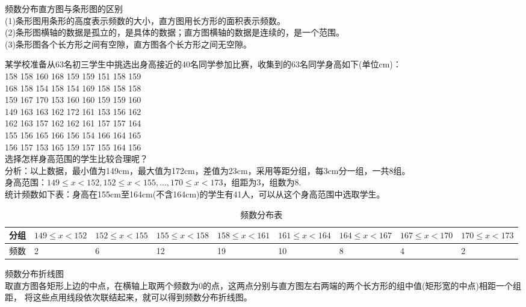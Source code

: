 \begin{theorem}
    频数分布直方图与条形图的区别 \\
    (1)条形图用条形的高度表示频数的大小，直方图用长方形的面积表示频数。\\
    (2)条形图横轴的数据是孤立的，是具体的数据；直方图横轴的数据是连续的，是一个范围。 \\
    (3)条形图各个长方形之间有空隙，直方图各个长方形之间无空隙。
\end{theorem}
\begin{example}
    某学校准备从63名初三学生中挑选出身高接近的40名同学参加比赛，收集到的63名同学身高如下(单位cm)：\\
    158 158 160 168 159 159 151 158 159 \\
    168 158 154 158 154 169 158 158 158 \\
    159 167 170 153 160 160 159 159 160 \\
    149 163 163 162 172 161 153 156 162 \\
    162 163 157 162 162 161 157 157 164 \\
    155 156 165 166 156 154 166 164 165 \\
    156 157 153 165 159 157 155 164 156 \\
    选择怎样身高范围的学生比较合理呢？\\
    分析：以上数据，最小值为149cm，最大值为172cm，差值为23cm，采用等距分组，每3cm分一组，一共8组。\\
    身高范围：$149 \le x < 152, 152 \le x < 155,...,170 \le x < 173$，组距为3，组数为8. \\
    统计频数如下表：身高在155cm至164cm(不含164cm)的学生有41人，可以从这个身高范围中选取学生。
\end{example}
\begin{table}[H]
    \centering
    \caption{频数分布表}
    \begin{tabular}{l|p{1.5cm}|p{1.5cm}|p{1.5cm}|p{1.5cm}|p{1.5cm}|p{1.5cm}|p{1.5cm}|p{1.5cm}}
        \hline
        分组 & $149\le x<152$ & $152\le x<155$ & $155\le x<158$ & $158\le x<161$ & $161\le x<164$ & $164\le x<167$ & $167\le x<170$ & $170\le x<173$ \\
        \hline
        频数 & 2              & 6              & 12             & 19             & 10             & 8              & 4              & 2              \\
        \hline
    \end{tabular}
\end{table}
\begin{theorem}
    频数分布折线图 \\
    取直方图各矩形上边的中点，在横轴上取两个频数为0的点，这两点分别与直方图左右两端的两个长方形的组中值(矩形宽的中点)相距一个组距，
    将这些点用线段依次联结起来，就可以得到频数分布折线图。
\end{theorem}
